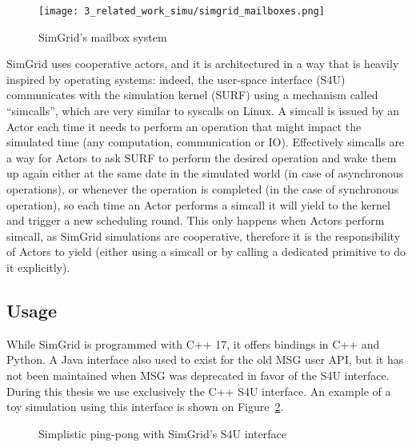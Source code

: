 \begin{figure}[!ht]
    \centering
    \texttt{[image: 3\_related\_work\_simu/simgrid\_mailboxes.png]}
    \caption{SimGrid's mailbox system}
    \label{fig:3_related_work_simu:SimGrid_mailboxes}
\end{figure}

SimGrid uses cooperative actors, and it is architectured in a way that is heavily
inspired by operating systems: indeed, the user-space interface (S4U)
communicates with the simulation kernel (SURF) using a mechanism called
``simcalls'', which are very similar to syscalls on Linux. A simcall is issued
by an Actor each time it needs to perform an operation that might impact the
simulated time (any computation, communication or IO). Effectively simcalls are
a way for Actors to ask SURF to perform the desired operation and wake them up
again either at the same date in the simulated world (in case of asynchronous
operations), or whenever the operation is completed (in the case of synchronous
operation), so each time an Actor performs a simcall it will yield to the kernel
and trigger a new scheduling round. This only happens when Actors perform
simcall, as SimGrid simulations are cooperative, therefore it is the
responsibility of Actors to yield (either using a simcall or by calling a
dedicated primitive to do it explicitly).

\subsection{Usage}

While SimGrid is programmed with C++ 17, it offers bindings in C++ and Python. A
Java interface also used to exist for the old MSG user API, but it has not been
maintained when MSG was deprecated in favor of the S4U interface. During this
thesis we use exclusively the C++ S4U interface. An example of a toy simulation
using this interface is shown on
Figure~\ref{fig:3_related_work_simu:SimGrid_pingpong}.

\begin{figure}[!ht]
    
    \caption{Simplistic ping-pong with SimGrid's S4U interface}
    \label{fig:3_related_work_simu:SimGrid_pingpong}
\end{figure}

